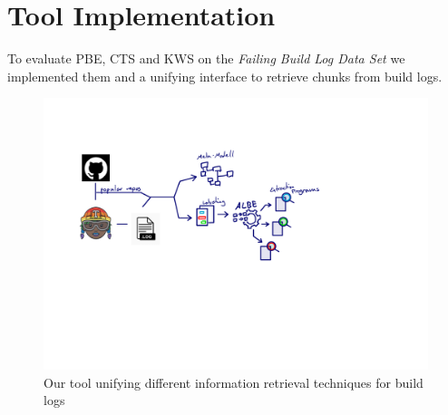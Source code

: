 \documentclass[\myrootdir/main.tex]{subfiles}
\begin{document}
\chapter{Tool Implementation}
\label{sec:implementation}
To evaluate PBE, CTS and KWS on the \emph{Failing Build Log Data Set} we implemented them and a unifying interface to retrieve chunks from build logs.

\begin{figure}[h]
	\centering
	\includegraphics[page=7, width=\textwidth, trim={0.5cm 0.5cm 0.5cm 0.5cm}, clip]{img/flow-of-research.pdf}
	\caption{Our tool unifying different information retrieval techniques for build logs}
	\label{fig:tool}
\end{figure}

\end{document}
